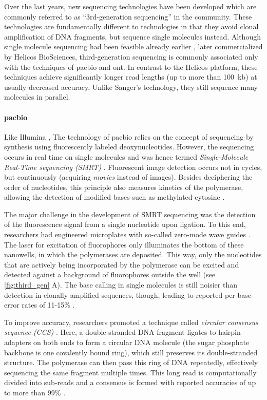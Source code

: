 Over the last years, new sequencing technologies have been developed which are
commonly referred to as ``3rd-generation sequencing'' in the community. These
technologies are fundamentally different to \mps technologies in that they avoid
clonal amplification of DNA fragments, but sequence single molecules instead.
Although single molecule sequencing had been feasible already earlier
\citep{Braslavsky2003}, later commercialized by Helicos BioSciences,
third-generation sequencing is commonly associated only with the techniques of
\acf{pacbio} and \acf{ont}. In contrast to the Helicos platform, these
techniques achieve significantly longer read lengths (up to more than 100~kb)
at usually decreased accuracy. Unlike Sanger's technology, they still sequence
many molecules in parallel.

\paragraph{\acl{pacbio}}
Like Illumina \mps, The technology of \acl{pacbio} relies on the concept of sequencing by synthesis using
fluorescently labeled deoxynucleotides. However, the sequencing
occurs in real time on single molecules and was hence termed
\emph{Single-Molecule Real-Time sequencing (SMRT)} \citep{Eid2009}. Fluorescent
image detection occurs not in cycles, but continuously (acquiring \emph{movies} instead of images).
Besides deciphering the order of nucleotides, this principle also measures
kinetics of the polymerase, allowing the detection of modified bases such as
methylated cytosine \citep{Flusberg2010}.

The major challenge in the development of SMRT sequencing
was the detection of the fluorescence signal from a single nucleotide upon
ligation. To this end, researchers had engineered microplates with so-called
zero-mode wave guides \citep{Uemura2010}. The laser for excitation of
fluorophores only illuminates the bottom of these nanowells, in which the
polymerases are deposited. This way, only the nucleotides that are actively
being incorporated by the polymerase can be excited and detected
against a background of fluorophores outside the well \citep{Heather2016} (see
\cref{fig:third_gen} A). The base calling in single molecules is still noisier than
detection in clonally amplified sequences, though, leading to reported per-base-error
rates of 11-15\% \citep{Rhoads2015}.

To improve accuracy, \pacbio researchers
promoted a technique called \emph{circular consensus sequence (CCS)}
\citep{Travers2010}. Here, a double-stranded DNA fragment ligates to hairpin
adapters on both ends to form a circular DNA molecule (the sugar phosphate
backbone is one covalently bound ring), which still preserves
its double-stranded structure. The polymerase can then pass this ring of DNA
repeatedly, effectively sequencing the same fragment multiple times. This long
read is computationally divided into sub-reads and a consensus is formed with
reported accuracies of up to more than 99\% \citep{Rhoads2015}.


